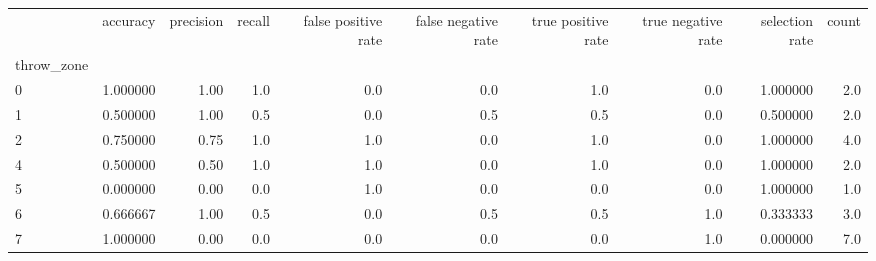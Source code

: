 \begin{tabular}{lrrrrrrrrr}
\toprule
{} &  accuracy &  precision &  recall &  false positive rate &  false negative rate &  true positive rate &  true negative rate &  selection rate &  count \\
throw\_zone &           &            &         &                      &                      &                     &                     &                 &        \\
\midrule
0          &  1.000000 &       1.00 &     1.0 &                  0.0 &                  0.0 &                 1.0 &                 0.0 &        1.000000 &    2.0 \\
1          &  0.500000 &       1.00 &     0.5 &                  0.0 &                  0.5 &                 0.5 &                 0.0 &        0.500000 &    2.0 \\
2          &  0.750000 &       0.75 &     1.0 &                  1.0 &                  0.0 &                 1.0 &                 0.0 &        1.000000 &    4.0 \\
4          &  0.500000 &       0.50 &     1.0 &                  1.0 &                  0.0 &                 1.0 &                 0.0 &        1.000000 &    2.0 \\
5          &  0.000000 &       0.00 &     0.0 &                  1.0 &                  0.0 &                 0.0 &                 0.0 &        1.000000 &    1.0 \\
6          &  0.666667 &       1.00 &     0.5 &                  0.0 &                  0.5 &                 0.5 &                 1.0 &        0.333333 &    3.0 \\
7          &  1.000000 &       0.00 &     0.0 &                  0.0 &                  0.0 &                 0.0 &                 1.0 &        0.000000 &    7.0 \\
\bottomrule
\end{tabular}
